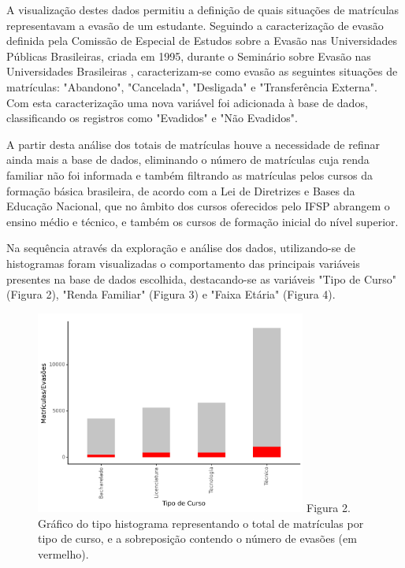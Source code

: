 \documentclass[conference]{IEEEtran}
\begin{document}
A visualização destes dados permitiu a definição de quais situações de matrículas representavam a evasão de um estudante. Seguindo a caracterização de evasão definida pela Comissão de Especial de Estudos sobre a Evasão nas Universidades Públicas Brasileiras, criada em 1995, durante o Seminário sobre Evasão nas Universidades Brasileiras \cite{silveira2021}, caracterizam-se como evasão as seguintes situações de matrículas: "Abandono", "Cancelada", "Desligada" e "Transferência Externa". Com esta caracterização uma nova variável foi adicionada à base de dados, classificando os registros como "Evadidos" e "Não Evadidos".\par
A partir desta análise dos totais de matrículas houve a necessidade de refinar ainda mais a base de dados, eliminando o número de matrículas cuja renda familiar não foi informada e também filtrando as matrículas pelos cursos da formação básica brasileira, de acordo com a Lei de Diretrizes e Bases da Educação Nacional, que no âmbito dos cursos oferecidos pelo IFSP abrangem o ensino médio e técnico, e também os cursos de formação inicial do nível superior.\par
Na sequência através da exploração e análise dos dados, utilizando-se de histogramas foram visualizadas o comportamento das principais variáveis presentes na base de dados escolhida, destacando-se as variáveis "Tipo de Curso" (Figura 2), "Renda Familiar" (Figura 3) e "Faixa Etária" (Figura 4).\par 

\begin{figure}[h]
    \includegraphics[width=8.9cm]{figs/figura-2.png}
    \centering
    Figura 2. Gráfico do tipo histograma representando o total de matrículas por tipo de curso, e a sobreposição contendo o número de evasões (em vermelho).
\end{figure}
\end{document}
